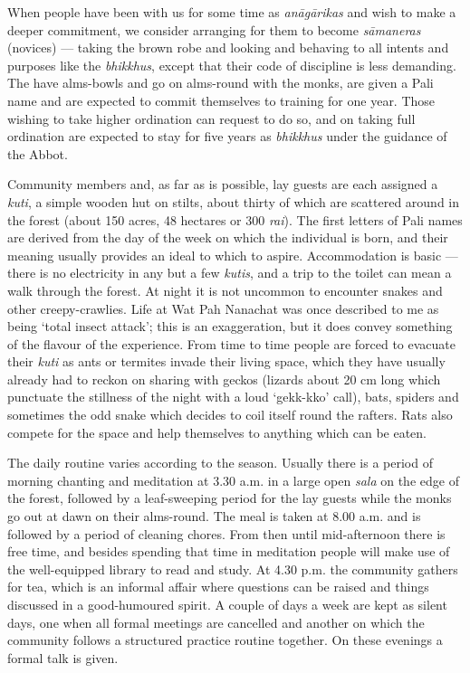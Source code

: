 When people have been with us for some time as \emph{anāgārikas} and
wish to make a deeper commitment, we consider arranging for them to
become \emph{sāmanera‎s} (novices) --- taking the brown robe and looking
and behaving to all intents and purposes like the \emph{bhikkhus},
except that their code of discipline is less demanding. The have
alms-bowls and go on alms-round with the monks, are given a Pali name
and are expected to commit themselves to training for one year. Those
wishing to take higher ordination can request to do so, and on taking
full ordination are expected to stay for five years as \emph{bhikkhus}
under the guidance of the Abbot.

Community members and, as far as is possible, lay guests are each
assigned a \emph{kuti}, a simple wooden hut on stilts, about thirty of
which are scattered around in the forest (about 150 acres, 48 hectares
or 300 \emph{rai}). The first letters of Pali names are derived from the
day of the week on which the individual is born, and their meaning
usually provides an ideal to which to aspire. Accommodation is basic ---
there is no electricity in any but a few \emph{kutis}, and a trip to the
toilet can mean a walk through the forest. At night it is not uncommon
to encounter snakes and other creepy-crawlies. Life at Wat Pah Nanachat
was once described to me as being `total insect attack'; this is an
exaggeration, but it does convey something of the flavour of the
experience. From time to time people are forced to evacuate their
\emph{kuti} as ants or termites invade their living space, which they
have usually already had to reckon on sharing with geckos (lizards about
20 cm long which punctuate the stillness of the night with a loud
`gekk-kko' call), bats, spiders and sometimes the odd snake which
decides to coil itself round the rafters. Rats also compete for the
space and help themselves to anything which can be eaten.

The daily routine varies according to the season. Usually there is a
period of morning chanting and meditation at 3.30 a.m. in a large open
\emph{sala} on the edge of the forest, followed by a leaf-sweeping
period for the lay guests while the monks go out at dawn on their
alms-round. The meal is taken at 8.00 a.m. and is followed by a period
of cleaning chores. From then until mid-afternoon there is free time,
and besides spending that time in meditation people will make use of the
well-equipped library to read and study. At 4.30 p.m. the community
gathers for tea, which is an informal affair where questions can be
raised and things discussed in a good-humoured spirit. A couple of days
a week are kept as silent days, one when all formal meetings are
cancelled and another on which the community follows a structured
practice routine together. On these evenings a formal talk is given.

